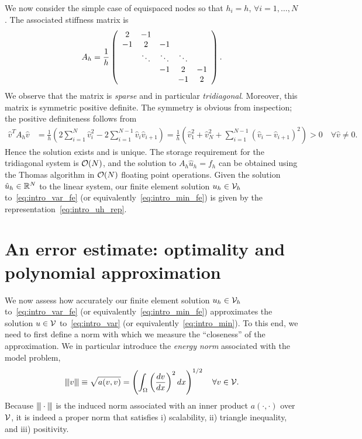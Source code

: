 We now consider the simple case of equispaced nodes so that $h_i = h$, $\forall i = 1,\dots,N$.  The associated stiffness matrix is
\begin{equation*}
  A_h = \frac{1}{h} \bmat{ccccc} 2 & -1 \\ -1 & 2 & -1 \\ & \ddots & \ddots & \ddots \\ & &-1 & 2 & -1 \\ &&& -1 & 2 \emat.
\end{equation*}
We observe that the matrix is \emph{sparse} and in particular \emph{tridiagonal}.  Moreover, this matrix is symmetric positive definite.  The symmetry is obvious from inspection; the positive definiteness follows from 
\begin{align*}
  \hat v^T A_h \hat v
  &=
  \frac{1}{h} \left(
  2\sum_{i=1}^N \hat v_i^2 - 2\sum_{i=1}^{N-1} \hat v_i\hat v_{i+1} 
  \right)
  =
  \frac{1}{h} \left(
  \hat v_1^2 + \hat v_{N}^2 + \sum_{i=1}^{N-1} (\hat v_i - \hat v_{i+1})^2 
  \right)
  > 0 \quad \forall \hat v \neq 0.
\end{align*}
Hence the solution exists and is unique.  The storage requirement for the tridiagonal system is $\calO(N)$, and the solution to $A_h \hat u_h = f_h$ can be obtained using the Thomas algorithm in $\calO(N)$ floating point operations.  Given the solution  $\hat u_h \in \RR^N$ to the linear system, our finite element solution $u_h \in \calV_h$ to~\eqref{eq:intro_var_fe} (or equivalently~\eqref{eq:intro_min_fe}) is given by the representation~\eqref{eq:intro_uh_rep}.

\section{An error estimate: optimality and polynomial approximation}
We now assess how accurately our finite element solution $u_h \in \calV_h$ to~\eqref{eq:intro_var_fe} (or equivalently~\eqref{eq:intro_min_fe}) approximates the solution $u \in \calV$ to~\eqref{eq:intro_var} (or equivalently~\eqref{eq:intro_min}).  To this end, we need to first define a norm with which we measure the ``closeness'' of the approximation. We in particular introduce the \emph{energy norm} associated with the model problem,
\begin{equation*}
  \enorm{v} \equiv \sqrt{a(v,v)}  = \left( \int_{\Omega} \left( \dd{v}{x} \right)^2 dx \right)^{1/2} \quad \forall v \in \calV.
\end{equation*}
Because $\enorm{ \cdot }$ is the induced norm associated with an inner product $a(\cdot,\cdot)$ over $\calV$, it is indeed a proper norm that satisfies i) scalability, ii) triangle inequality, and iii) positivity.  

